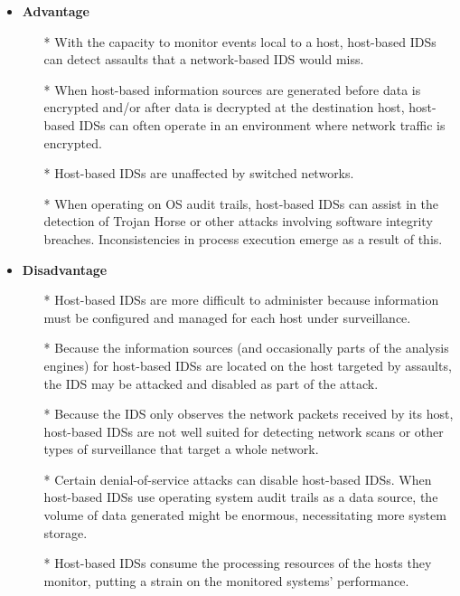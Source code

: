 \documentclass[12pt]{article}
\begin{document}
\begin{enumerate}
         \begin{itemize}
            \item \textbf{Advantage}
            \begin{itemize}
                \item[*] With the capacity to monitor events local to a host, host-based IDSs can detect assaults that a network-based IDS would miss.
                \item[*] When host-based information sources are generated before data is encrypted and/or after data is decrypted at the destination host, host-based IDSs can often operate in an environment where network traffic is encrypted. 
                \item[*] Host-based IDSs are unaffected by switched networks.
                \item[*] When operating on OS audit trails, host-based IDSs can assist in the detection of Trojan Horse or other attacks involving software integrity breaches.  Inconsistencies in process execution emerge as a result of this.
            \end{itemize}
        \item \textbf{Disadvantage}
        \begin{itemize}
            \item[*] Host-based IDSs are more difficult to administer because information must be configured and managed for each host under surveillance.
            \item[*] Because the information sources (and occasionally parts of the analysis engines) for host-based IDSs are located on the host targeted by assaults, the IDS may be attacked and disabled as part of the attack.
            \item[*] Because the IDS only observes the network packets received by its host, host-based IDSs are not well suited for detecting network scans or other types of surveillance that target a whole network.
            \item[*] Certain denial-of-service attacks can disable host-based IDSs. When host-based IDSs use operating system audit trails as a data source, the volume of data generated might be enormous, necessitating more system storage.
            \item[*] Host-based IDSs consume the processing resources of the hosts they monitor, putting a strain on the monitored systems' performance.
        \end{itemize}
        \end{itemize}
    \clearpage
    

\end{enumerate}
\end{document}
